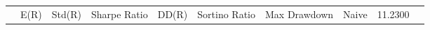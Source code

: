 \begin{tabular}{lrrrrrrrrr}
 & E(R) & Std(R) & Sharpe Ratio & DD(R) & Sortino Ratio & Max Drawdown & %
Naive & 11.2300%
\end{tabular}
